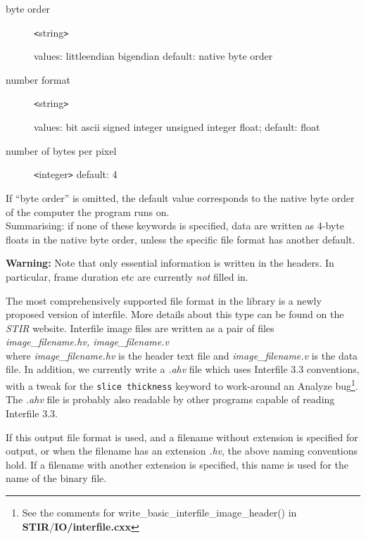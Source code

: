 \documentclass{article}
\begin{document}
\begin{description}
\item[byte order] \texttt{<}string\texttt{>}\linebreak
\raggedright
 values: littleendian {\textbar} bigendian\linebreak
 default: native byte order

\item[number format] \texttt{<}string\texttt{>}\linebreak
\raggedright
 values: bit {\textbar} ascii 
{\textbar} signed integer {\textbar} 
 unsigned integer {\textbar} float;\linebreak
default: float
\item[number of bytes per pixel] \texttt{<}integer\texttt{>}\linebreak
 default: 4
\end{description}


If ``byte order'' is omitted, the default value corresponds to 
the native byte order of the computer the program runs on.\\
Summarising: if none of these keywords is specified, data are 
written as 4-byte floats in the native byte order, unless the 
specific file format has another default.



\textbf{Warning:} Note that only essential information is written 
in the headers. In particular, frame duration etc are currently \textit{not} 
filled in.

{ 
}
\label{sec:outputinterfile}
The most comprehensively supported file format in the library 
is a newly proposed version of interfile. More details about 
this type can be found on the \textit{STIR} website.
Interfile image files are written as a pair of files
\textit{image\_filename.hv,
image\_filename.v}\\
where \textit{image\_filename.hv} is the header text file and \textit{image\_filename.v} 
is the data file. In addition, we currently write a \textit{.ahv} 
file which uses Interfile 3.3 conventions, with a tweak for the 
\texttt{slice thickness} keyword to work-around an Analyze\texttrademark{} 
bug\footnote{See the comments for write\_basic\_interfile\_image\_header() 
in \textbf{STIR}/\textbf{IO/interfile.cxx}}. The \textit{.ahv} file is probably 
also readable by other programs capable of reading Interfile 
3.3.


If this output file format is used, and a filename without extension 
is specified for output, or when the filename has an extension \textit{.hv}, 
the above naming conventions hold. If a filename with another 
extension is specified, this name is used for the name of the 
binary file. 
\end{document}
